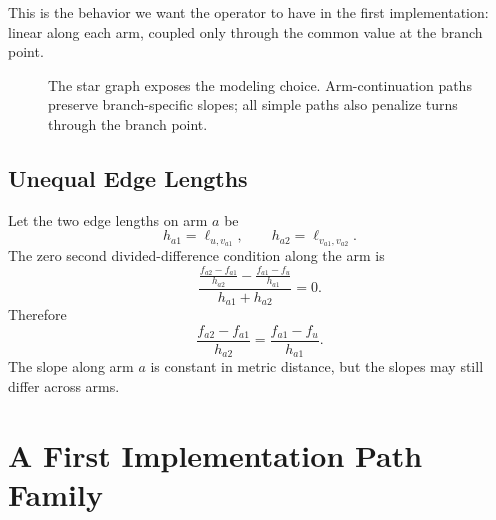 \documentclass[11pt]{article}
\begin{document}
This is the behavior we want the operator to have in the first implementation:
linear along each arm, coupled only through the common value at the branch
point.

\begin{figure}[ht]
\centering
{}
\caption{The star graph exposes the modeling choice.  Arm-continuation paths
preserve branch-specific slopes; all simple paths also penalize turns through
the branch point.}
\end{figure}

\subsection{Unequal Edge Lengths}

Let the two edge lengths on arm \(a\) be
\[
  h_{a1}=\ell_{u,v_{a1}},
  \qquad
  h_{a2}=\ell_{v_{a1},v_{a2}}.
\]
The zero second divided-difference condition along the arm is
\[
  \frac{
    \frac{f_{a2}-f_{a1}}{h_{a2}}
    -
    \frac{f_{a1}-f_u}{h_{a1}}
  }{
    h_{a1}+h_{a2}
  }
  =0.
\]
Therefore
\[
  \frac{f_{a2}-f_{a1}}{h_{a2}}
  =
  \frac{f_{a1}-f_u}{h_{a1}}.
\]
The slope along arm \(a\) is constant in metric distance, but the slopes may
still differ across arms.

\section{A First Implementation Path Family}
\end{document}
